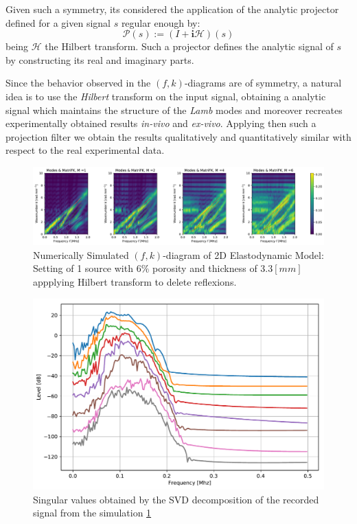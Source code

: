 Given such a symmetry, its considered the application of the analytic projector defined for a given signal $s$ regular enough by:
\begin{equation*}
    \mathcal{P}(s) := (I + \mathbf{i}\mathcal{H})(s)
\end{equation*}
being $\mathcal{H}$ the Hilbert transform. Such a projector defines the analytic signal of $s$ by constructing its real and imaginary parts.

Since the behavior observed in the $(f,k)$-diagrams are of symmetry, a natural idea is to use the \textit{Hilbert} transform on the input signal, obtaining a analytic signal which maintains the structure of the \textit{Lamb} modes and moreover recreates experimentally obtained results \textit{in-vivo} and \textit{ex-vivo}.
Applying then such a projection filter we obtain the results qualitatively and quantitatively similar with respect to the real experimental data.

\begin{figure}[!h]
	\centering
	\includegraphics[width=\textwidth]{images/TimeSingSous/2DTimeHilb_P6ElasticFK33M1460_y.pdf}
	\caption{Numerically Simulated $(f,k)$-diagram of 2D Elastodynamic Model: Setting of 1 source with $6\%$ porosity and thickness of $3.3 [mm]$ appplying Hilbert transform to delete reflexions.}
	\label{FK-Hil-DiagramS1P6M33}
\end{figure} 

\begin{figure}[!h]  
	\centering
	\includegraphics[scale=.5]{images/TimeSingSous/2DTimeHilb_P6Elastic33_SV.pdf}
	\caption{Singular values obtained by the SVD decomposition of the recorded signal from the simulation \ref{FK-Hil-DiagramS1P6M33}}
	\label{SVD-Hil-S1P7M33}
\end{figure}


